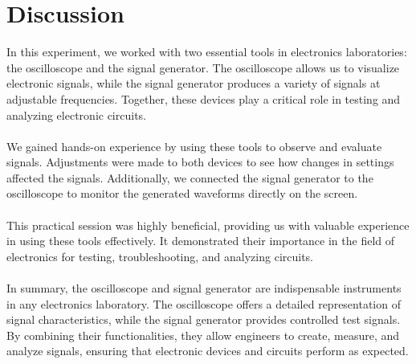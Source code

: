 \documentclass[12pt]{article}
\begin{document}
\section*{Discussion}
In this experiment, we worked with two essential tools in electronics laboratories: the oscilloscope and the signal generator. The oscilloscope allows us to visualize electronic signals, while the signal generator produces a variety of signals at adjustable frequencies. Together, these devices play a critical role in testing and analyzing electronic circuits.\\\\
We gained hands-on experience by using these tools to observe and evaluate signals. Adjustments were made to both devices to see how changes in settings affected the signals. Additionally, we connected the signal generator to the oscilloscope to monitor the generated waveforms directly on the screen.\\\\
This practical session was highly beneficial, providing us with valuable experience in using these tools effectively. It demonstrated their importance in the field of electronics for testing, troubleshooting, and analyzing circuits.\\\\
In summary, the oscilloscope and signal generator are indispensable instruments in any electronics laboratory. The oscilloscope offers a detailed representation of signal characteristics, while the signal generator provides controlled test signals. By combining their functionalities, they allow engineers to create, measure, and analyze signals, ensuring that electronic devices and circuits perform as expected.
\end{document}
